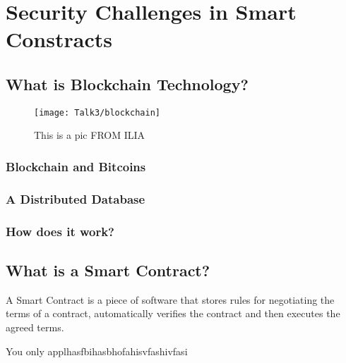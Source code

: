 \chapter{Security Challenges in Smart Constracts}


\newpage

\minitoc %

\newpage

\section{What is Blockchain Technology?}
       \begin{figure}[ht]
         \begin{center}
         \texttt{[image: Talk3/blockchain]}
         \end{center}
         \caption{This is a pic FROM ILIA}
         \label{label}
       \end{figure}
       
\subsection{Blockchain and Bitcoins}
\subsection{A Distributed Database}
\subsection{How does it work?}


\section{What is a Smart Contract?}
A Smart Contract is a piece of software that stores rules for negotiating the terms of a contract, automatically verifies the contract and then executes the agreed terms. 


You only applhasfbihasbhofahisvfashivfasi